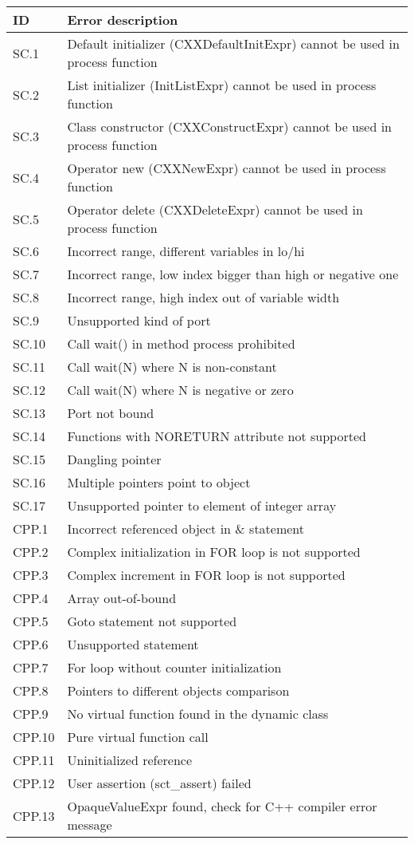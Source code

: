 \begin{longtable}{| p{} | p{} |} 
\hline
ID & Error description \\
\hline
SC.1 & Default initializer (CXXDefaultInitExpr) cannot be used in process function \\
SC.2 & List initializer (InitListExpr) cannot be used in process function \\
SC.3 & Class constructor (CXXConstructExpr) cannot be used in process function \\
SC.4 & Operator new (CXXNewExpr) cannot be used in process function \\
SC.5 & Operator delete (CXXDeleteExpr) cannot be used in process function \\
SC.6 & Incorrect range, different variables in lo/hi \\
SC.7 & Incorrect range, low index bigger than high or negative one \\
SC.8 & Incorrect range, high index out of variable width \\
SC.9 & Unsupported kind of port \\
SC.10 & Call wait() in method process prohibited \\
SC.11 & Call wait(N) where N is non-constant \\
SC.12 & Call wait(N) where N is negative or zero \\
SC.13 & Port not bound \\
SC.14 & Functions with NORETURN attribute not supported \\
SC.15 & Dangling pointer \\
SC.16 & Multiple pointers point to object \\
SC.17 & Unsupported pointer to element of integer array \\
\hline

CPP.1 & Incorrect referenced object in \& statement  \\
CPP.2 & Complex initialization in FOR loop is not supported  \\
CPP.3 & Complex increment in FOR loop is not supported  \\
CPP.4 & Array out-of-bound  \\
CPP.5 & Goto statement not supported  \\
CPP.6 & Unsupported statement  \\
CPP.7 & For loop without counter initialization \\
CPP.8 & Pointers to different objects comparison \\
CPP.9 & No virtual function found in the dynamic class \\
CPP.10 & Pure virtual function call   \\
CPP.11 & Uninitialized reference \\
CPP.12 & User assertion (sct\_assert) failed \\
CPP.13 & OpaqueValueExpr found, check for C++ compiler error message \\
\hline


\end{longtable}
